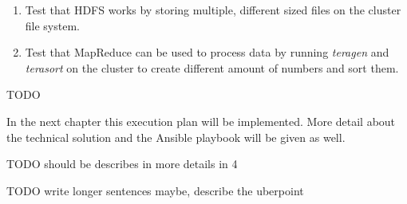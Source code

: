 \begin{enumerate}
\begin{enumerate}
            \item Test that \ac{HDFS} works by storing multiple, different sized files on the cluster file system.
            \item Test that MapReduce can be used to process data by running \emph{teragen} and \emph{terasort} on the cluster to create different amount of numbers and sort them.
        \end{enumerate}
        
    TODO

\end{enumerate}

In the next chapter this execution plan will be implemented. More detail about the technical solution and the Ansible playbook will be given as well.

TODO should be describes in more details in 4

TODO write longer sentences maybe, describe the uberpoint

